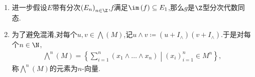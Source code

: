 \begin{remark}{}{}
	\begin{enumerate}
		\item 进一步假设$E$带有分次$\left(E_{n}\right)_{n\in\Z}$,$f$满足$\im\left(f\right)\subseteq E_{1}$,那么$g$是$\Z$型分次代数同态.
		\item 为了避免混淆,对每个$u,v\in\bigwedge\left(M\right)$,记$u\wedge v\coloneq\left(u+I_{\wedge}\right)\left(v+I_{\wedge}\right)$.于是对每个$n\in\N$,
		\begin{align*}
			\bigwedge^{n}\left(M\right)=\left\{\sum\limits_{i=1}^{n}\left(x_{1}\wedge\ldots\wedge x_{n}\right)\middle|\left(x_{i}\right)_{i=1}^{n}\in M^{n}\right\},
		\end{align*}
		称$\bigwedge\limits^{n}\left(M\right)$的元素为$n$-向量.
	\end{enumerate}
\end{remark}




















